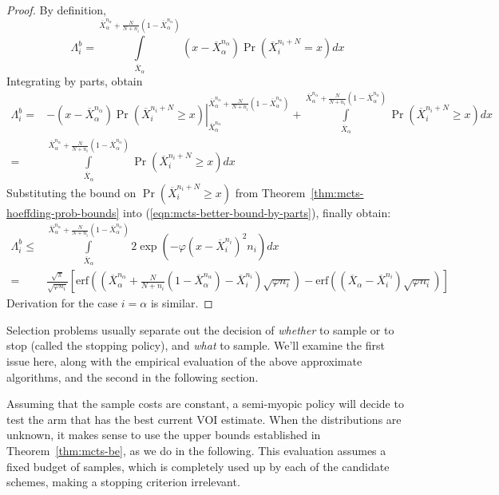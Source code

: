 \begin{proof}By definition,
\begin{equation}
\Lambda_i^b=\int\limits_{\overline X_\alpha}^{\overline X_\alpha^{n_\alpha}+\frac N {N+n_i}(1-\overline X_\alpha^{n_\alpha})}(x-\overline X_\alpha^{n_\alpha})\Pr\left(\overline X_i^{n_i+N}=x\right)dx
\label{eqn:mcts-lambda-blinkered-by-def}
\end{equation}
Integrating by parts, obtain
\begin{align}
\Lambda_i^b=&-\left.(x-\overline X_\alpha^{n_\alpha})\Pr\left(\overline X_i^{n_i+N}\ge x\right)\right|_{\overline X_\alpha^{n_\alpha}}^{\overline X_\alpha^{n_\alpha}+\frac N {N+n_i}(1-\overline X_\alpha^{n_\alpha})}+\int\limits_{\overline X_\alpha}^{\overline X_\alpha^{n_\alpha}+\frac N {N+n_i}(1-\overline X_\alpha^{n_\alpha})}\Pr\left(\overline X_i^{n_i+N}\ge x\right)dx\nonumber\\
=&\int\limits_{\overline X_\alpha}^{\overline X_\alpha^{n_\alpha}+\frac N {N+n_i}(1-\overline X_\alpha^{n_\alpha})}\Pr\left(\overline X_i^{n_i+N}\ge x\right)dx
\label{eqn:mcts-better-bound-by-parts}
\end{align}
Substituting the bound on $\Pr\left(\overline X_i^{n_i+N}\ge x\right)$ from Theorem~\ref{thm:mcts-hoeffding-prob-bounds} into (\ref{eqn:mcts-better-bound-by-parts}), finally obtain:
\begin{align}
\Lambda_i^b\le&\int\limits_{\overline X_\alpha}^{\overline X_\alpha^{n_\alpha}+\frac N {N+n_i}(1-\overline X_\alpha^{n_\alpha})}2\exp\left(-\varphi(x-\overline X_i^{n_i})^2n_i\right)dx\nonumber\\
 =&\frac {\sqrt \pi} {\sqrt {\varphi n_i}}
  \left[\mathrm{erf}\left(\left(\overline X_\alpha^{n_\alpha}+\frac N {N+n_i}(1-\overline X_\alpha^{n_\alpha})-\overline X_i^{n_i}\right)\sqrt {\varphi n_i}\right)-\mathrm{erf}\left((\overline X_\alpha - \overline X_i^{n_i})\sqrt{\varphi n_i}\right)\right]
\end{align}
Derivation for the case $i=\alpha$ is similar.
\end{proof}



Selection problems usually separate out the decision of {\em whether} to
sample or to stop (called the stopping policy), and {\em what} to sample.
We'll examine the first issue here, along with the empirical evaluation 
of the above approximate algorithms, and the second in the following section.

Assuming that the sample costs are constant,
a semi-myopic policy will decide to test the arm that has the best
current VOI estimate. 
When the distributions are unknown, it makes sense
to use the upper bounds established in Theorem~\ref{thm:mcts-be}, as we do in the following.
This evaluation assumes a fixed budget of samples, which is
completely used up by each of the candidate schemes, making a stopping
criterion irrelevant.

